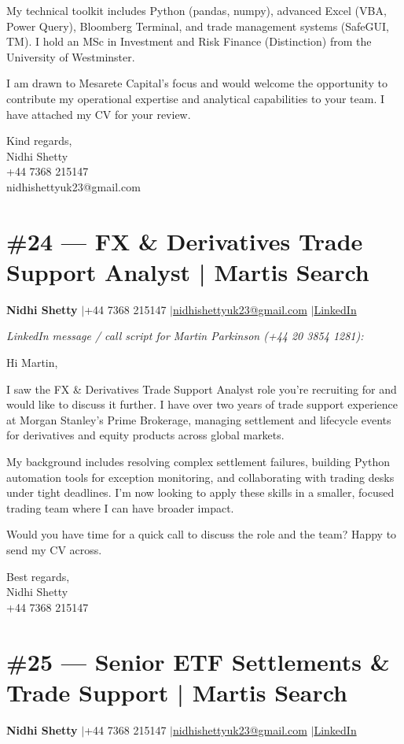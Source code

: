 \documentclass[11pt,a4paper]{article}
\makeatletter
\newcommand{\coverheader}{%
\begin{flushleft}
{\bfseries Nidhi Shetty} \enspace$\vert$\enspace +44 7368 215147 \enspace$\vert$\enspace \href{mailto:nidhishettyuk23@gmail.com}{nidhishettyuk23@gmail.com} \enspace$\vert$\enspace \href{https://www.linkedin.com/in/nidhi-shetty23-1841b7181}{LinkedIn}
\end{flushleft}
\vspace{4pt}
}
\makeatother
\begin{document}
My technical toolkit includes Python (pandas, numpy), advanced Excel (VBA, Power Query), Bloomberg Terminal, and trade management systems (SafeGUI, TM). I hold an MSc in Investment and Risk Finance (Distinction) from the University of Westminster.

I am drawn to Mesarete Capital's focus and would welcome the opportunity to contribute my operational expertise and analytical capabilities to your team. I have attached my CV for your review.

\vspace{8pt}
Kind regards,\\
Nidhi Shetty\\
+44 7368 215147\\
nidhishettyuk23@gmail.com

\newpage
\section{\#24 --- FX \& Derivatives Trade Support Analyst | Martis Search}
\coverheader

\textit{LinkedIn message / call script for Martin Parkinson (+44 20 3854 1281):}

\vspace{6pt}

Hi Martin,

I saw the FX \& Derivatives Trade Support Analyst role you're recruiting for and would like to discuss it further. I have over two years of trade support experience at Morgan Stanley's Prime Brokerage, managing settlement and lifecycle events for derivatives and equity products across global markets.

My background includes resolving complex settlement failures, building Python automation tools for exception monitoring, and collaborating with trading desks under tight deadlines. I'm now looking to apply these skills in a smaller, focused trading team where I can have broader impact.

Would you have time for a quick call to discuss the role and the team? Happy to send my CV across.

\vspace{8pt}
Best regards,\\
Nidhi Shetty\\
+44 7368 215147

\newpage
\section{\#25 --- Senior ETF Settlements \& Trade Support | Martis Search}
\coverheader
\end{document}
